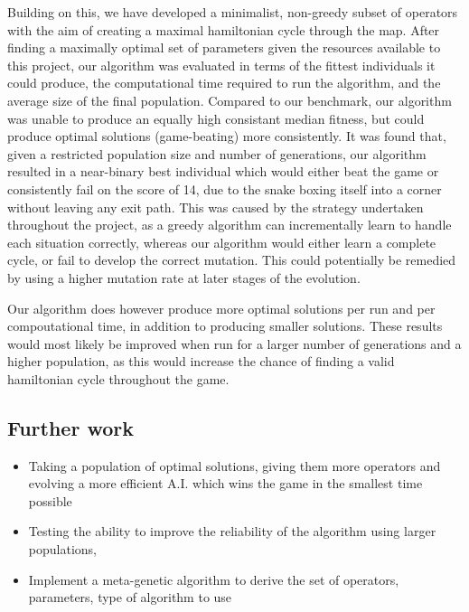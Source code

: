\documentclass[british,10pt,a4paper]{article}
\begin{document}
Building on this, we have developed a minimalist, non-greedy subset of operators with the aim of creating a maximal hamiltonian cycle through the map. After finding a maximally optimal set of parameters given the resources available to this project, our algorithm was evaluated in terms of the fittest individuals it could produce, the computational time required to run the algorithm, and the average size of the final population. Compared to our benchmark, our algorithm was unable to produce an equally high consistant median fitness, but could produce optimal solutions (game-beating) more consistently. It was found that, given a restricted population size and number of generations, our algorithm resulted in a near-binary best individual which would either beat the game or consistently fail on the score of 14, due to the snake boxing itself into a corner without leaving any exit path. This was caused by the strategy undertaken throughout the project, as a greedy algorithm can incrementally learn to handle each situation correctly, whereas our algorithm would either learn a complete cycle, or fail to develop the correct mutation. This could potentially be remedied by using a higher mutation rate at later stages of the evolution. \newline

Our algorithm does however produce more optimal solutions per run and per compoutational time, in addition to producing smaller solutions. These results would most likely be improved when run for a larger number of generations and a higher population, as this would increase the chance of finding a valid hamiltonian cycle throughout the game.

\subsection{Further work}

\begin{itemize}
	\item Taking a population of optimal solutions, giving them more operators and evolving a more efficient A.I. which wins the game in the smallest time possible
	\item Testing the ability to improve the reliability of the algorithm using larger populations, 
	\item Implement a meta-genetic algorithm to derive the set of operators, parameters, type of algorithm to use
\end{itemize}

\clearpage
\end{document}
